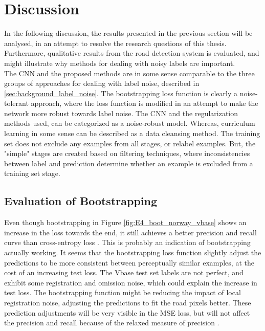 \section{Discussion}
\label{sec:Discussion}
In the following discussion, the results presented in the previous section will be analysed, in an attempt to resolve the research questions of this thesis. Furthermore, qualitative results from the road detection system is evaluated, and might illustrate why methods for dealing with noisy labels are important.\\

The \ac{CNN} and the proposed methods are in some sense comparable to the three groups of approaches for dealing with label noise, described in \ref{sec:background_label_noise}. The bootstrapping loss function is clearly a noise-tolerant approach, where the loss function is modified in an attempt to make the network more robust towards label noise. The \ac{CNN} and the regularization methods used, can be categorized as a noise-robust model. Whereas, curriculum learning in some sense can be described as a data cleansing method. The training set does not exclude any examples from all stages, or relabel examples. But, the "simple" stages are created based on filtering techniques, where inconsistencies between label and prediction determine whether an example is excluded from a training set stage.  \\


\subsection{Evaluation of Bootstrapping}
Even though bootstrapping in Figure \ref{fig:E4_boot_norway_vbase} shows an increase in the loss towards the end, it still achieves a better precision and recall curve than cross-entropy loss . This is probably an indication of bootstrapping actually working. It seems that the bootstrapping loss function slightly adjust the predictions to be more consistent between perceptually similar examples, at the cost of an increasing test loss. The Vbase test set labels are not perfect, and exhibit some registration and omission noise, which could explain the increase in test loss. The bootstrapping function might be reducing the impact of local registration noise,  adjusting the predictions to fit the road pixels better. These prediction adjustments will be very visible in the MSE loss, but will not affect the precision and recall because of the relaxed measure of precision . \\

